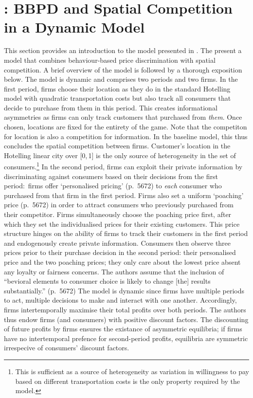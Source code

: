 \documentclass[a4paper, 11 pt, fleqn]{article}
\begin{document}
\section{\citet{Choe.2018}: BBPD and Spatial Competition in a Dynamic Model} \label{sec:choe-2018-intro}
%
This section provides an introduction to the model presented in \citet{Choe.2018}. The present a model that combines
behaviour-based price discrimination with spatial competition. A brief overview of the model is followed by a thorough
exposition below. The model is dynamic and comprises two periods and two firms.
In the first period, firms choose their location as they do in the standard Hotelling model with quadratic transportation costs
but also track all consumers that decide to purchase from them in this period. This creates informational asymmetries as
firms can only track customers that purchased from \textit{them}. Once chosen, locations are fixed for the entirety of the
game. Note that the competiton for location is also a competition for information. In the baseline model, this thus concludes the
spatial competition between firms. Customer's location in the Hotelling linear city over [0,\,1] is the only source of heterogeneity
in the set of consumers.\footnote{This is sufficient as a source of heterogeneity as variation in willingness to pay based on different
transportation costs is the only property required by the model.} In the second period, firms can exploit their private information by
discriminating against consumers based on their decisions from the first period:~firms offer `personalised pricing' (p.~5672) to
\textit{each} consumer who purchased from that firm in the first period. Firms also set a uniform `poaching' price (p.~5672) in
order to attract consumers who previously purchased from their competitor. Firms simultaneously choose the poaching price first,
after which they set the individualised prices for their existing customers. This price structure hinges on the ability of firms
to track their customers in the first period and endogenously create private information. Consumers then observe three prices
prior to their purchase decision in the second period: their personalised price and the two poaching prices; they only care about
the lowest price absent any loyalty or fairness concerns. The authors assume that the inclusion of ``bevioral elements to consumer
choice is likely to change [the] results substantially.'' (p.~5672) The model is dynamic since firms have multiple periods to act,
multiple decisions to make and interact with one another. Accordingly, firms intertemporally maximise their total profits over both
periods. The authors thus endow firms (and consumers) with positive discount factors. The discounting of future profits by firms
ensures the existance of asymmetric equilibria; if firms have no intertemporal prefence for second-period profits, equilibria are
symmetric irrespecive of consumers' discount factors.
%
\end{document}
